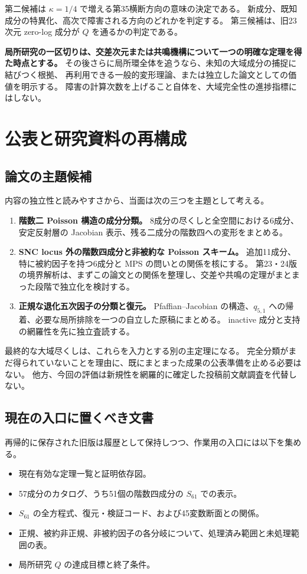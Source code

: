 \documentclass[11pt,a4paper]{ltjsarticle}
\theoremstyle{remark}\newtheorem{remark}[proposition]{注意}
\begin{document}
第二候補は $\kappa=1/4$ で増える第35横断方向の意味の決定である。
新成分、既知成分の特異化、高次で障害される方向のどれかを判定する。
第三候補は、旧23次元 zero-log 成分が $Q$ を通るかの判定である。

\textbf{局所研究の一区切りは、交差次元または共鳴機構について一つの明確な定理を得た時点とする。}
その後さらに局所環全体を追うなら、未知の大域成分の捕捉に結びつく根拠、
再利用できる一般的変形理論、または独立した論文としての価値を明示する。
障害の計算次数を上げること自体を、大域完全性の進捗指標にはしない。

\section{公表と研究資料の再構成}

\subsection{論文の主題候補}

内容の独立性と読みやすさから、当面は次の三つを主題として考える。
\begin{enumerate}
\item \textbf{階数二 Poisson 構造の成分分類。}
8成分の尽くしと全空間における6成分、安定反射層の Jacobian 表示、残る二成分の階数四への変形をまとめる。
\item \textbf{SNC locus 外の階数四成分と非被約な Poisson スキーム。}
追加11成分、特に被約因子を持つ6成分と MPS の問いとの関係を核にする。
第23・24版の境界解析は、まずこの論文との関係を整理し、交差や共鳴の定理がまとまった段階で独立化を検討する。
\item \textbf{正規な退化五次因子の分類と復元。}
Pfaffian--Jacobian の構造、$q_{5,1}$ への帰着、必要な局所排除を一つの自立した原稿にまとめる。
inactive 成分と支持の網羅性を先に独立査読する。
\end{enumerate}

最終的な大域尽くしは、これらを入力とする別の主定理になる。
完全分類がまだ得られていないことを理由に、既にまとまった成果の公表準備を止める必要はない。
他方、今回の評価は新規性を網羅的に確定した投稿前文献調査を代替しない。

\subsection{現在の入口に置くべき文書}

再帰的に保存された旧版は履歴として保持しつつ、作業用の入口には以下を集める。
\begin{itemize}
\item 現在有効な定理一覧と証明依存図。
\item 57成分のカタログ、うち51個の階数四成分の $S_{61}$ での表示。
\item $S_{61}$ の全方程式、復元・検証コード、および45変数断面との関係。
\item 正規、被約非正規、非被約因子の各分岐について、処理済み範囲と未処理範囲の表。
\item 局所研究 $Q$ の達成目標と終了条件。
\end{itemize}
\end{document}
